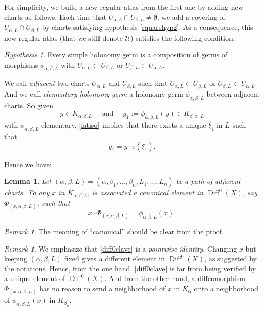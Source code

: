 \documentclass[JEP,XML,SOM,Unicode]{cedram}
\let\mathcal\mathscr
\DeclareMathOperator{\Diff}{Diff}
\theoremstyle{plain}
\newtheorem{lemma}[theorem]{Lemma}
\theoremstyle{definition}
\theoremstyle{remark}
\newtheorem{remark}[theorem]{Remark}
\newtheorem{hypothesis}[theorem]{Hypothesis}
\numberwithin{equation}{section}
\begin{document}
For simplicity, we build a new regular atlas from the first one by adding new charts as follows. Each time that $U_{\alpha, L}\cap U_{\beta,L}\not = \emptyset$, we add a covering of $U_{\alpha, L}\cap U_{\beta,L}$ by charts satisfying hypothesis \ref{squarehyp2}. As a consequence, this new regular atlas (that we still denote $\mathcal U$) satisfies the following condition.
\begin{hypothesis}
\label{intercondition}
Every simple holonomy germ is a composition of germs of morphisms $\phi_{\alpha, \beta, L}$ with $U_{\alpha,L}\subset U_{\beta,L}$ or $U_{\beta,L}\subset U_{\alpha,L}$.
\end{hypothesis}
We call \emph{adjacent} two charts $U_{\alpha,L}$ and $U_{\beta,L}$ such that $U_{\alpha,L}\subset U_{\beta,L}$ or $U_{\beta,L}\subset U_{\alpha,L}$. And we call \emph{elementary holonomy germ} a holonomy germ $\phi_{\alpha, \beta, L}$ between adjacent charts. So given
\begin{equation}
\label{ic2}
y\in K_{\alpha,\beta,L}\quad\text{ and }\quad y_1:=\phi_{\alpha,\beta, L}(y)\in K_{\beta, \alpha, L}
\end{equation}
with $\phi_{\alpha, \beta, L}$ elementary, \eqref{fatiso} implies that there exists a unique $\xi_1$ in $L$ such that
\begin{equation}
\label{ic3}
y_1=y\cdot e(\xi_1).
\end{equation}

\pagebreak[2]
Hence we have:
\begin{lemma}
\label{diff0encoding}
Let $(\alpha,\beta,L)=(\alpha,\beta_1,\hdots,\beta_n,L_1,\hdots, L_n)$ be a path of adjacent charts.
To any $x$ in $K_{\alpha,\beta, L}$, is associated a canonical element in $\Diff^0(X)$, say $\Phi_{(x,\alpha,\beta, L)}$, such that
\begin{equation}
\label{diff0clave}
x\cdot\Phi_{(x,\alpha,\beta, L)}=\phi_{\alpha,\beta, L}(x).
\end{equation}
\end{lemma}
\begin{remark}
The meaning of ``canonical'' should be clear from the proof.
\end{remark}

\begin{remark}
We emphasize that \eqref{diff0clave} is a \emph{pointwise identity}. Changing $x$ but keeping $(\alpha,\beta,L)$ fixed gives a different element in $\Diff^0(X)$, as suggested by the notations. Hence, from the one hand, \eqref{diff0clave} is far from being verified by a unique element of $\Diff^0(X)$. And from the other hand, a diffeomorphism $\Phi_{(x,\alpha,\beta, L)}$ has no reason to send a neighborhood of $x$ in $K_\alpha$ onto a neighborhood of $\phi_{\alpha,\beta, L}(x)$ in $K_{\beta_n}$.
\end{remark}
\end{document}

